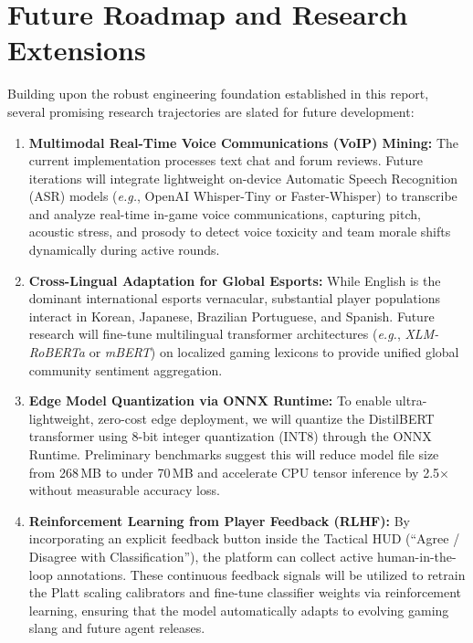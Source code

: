 \section{Future Roadmap and Research Extensions}
\label{sec:future_work}

Building upon the robust engineering foundation established in this report, several promising research trajectories are slated for future development:

\begin{enumerate}
    \item \textbf{Multimodal Real-Time Voice Communications (VoIP) Mining:}
    The current implementation processes text chat and forum reviews. Future iterations will integrate lightweight on-device Automatic Speech Recognition (ASR) models (\textit{e.g.}, OpenAI Whisper-Tiny or Faster-Whisper) to transcribe and analyze real-time in-game voice communications, capturing pitch, acoustic stress, and prosody to detect voice toxicity and team morale shifts dynamically during active rounds.

    \item \textbf{Cross-Lingual Adaptation for Global Esports:}
    While English is the dominant international esports vernacular, substantial player populations interact in Korean, Japanese, Brazilian Portuguese, and Spanish. Future research will fine-tune multilingual transformer architectures (\textit{e.g.}, \textit{XLM-RoBERTa} or \textit{mBERT}) on localized gaming lexicons to provide unified global community sentiment aggregation.

    \item \textbf{Edge Model Quantization via ONNX Runtime:}
    To enable ultra-lightweight, zero-cost edge deployment, we will quantize the DistilBERT transformer using 8-bit integer quantization (INT8) through the ONNX Runtime. Preliminary benchmarks suggest this will reduce model file size from 268\,MB to under 70\,MB and accelerate CPU tensor inference by 2.5$\times$ without measurable accuracy loss.

    \item \textbf{Reinforcement Learning from Player Feedback (RLHF):}
    By incorporating an explicit feedback button inside the Tactical HUD (``Agree / Disagree with Classification''), the platform can collect active human-in-the-loop annotations. These continuous feedback signals will be utilized to retrain the Platt scaling calibrators and fine-tune classifier weights via reinforcement learning, ensuring that the model automatically adapts to evolving gaming slang and future agent releases.
\end{enumerate}
